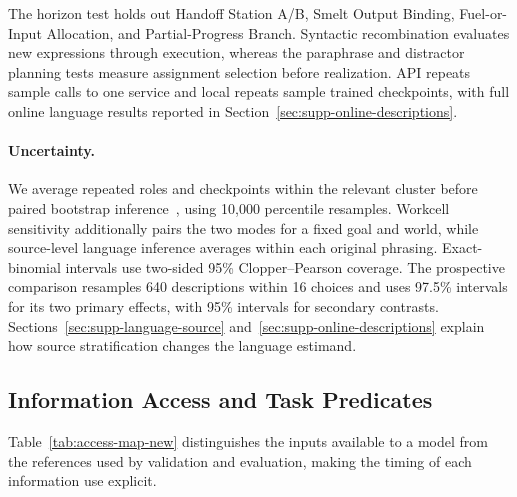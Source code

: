 \documentclass[sigconf,nonacm,balance=false]{aamas}
\begin{document}
The horizon test holds out Handoff Station A/B, Smelt Output Binding, Fuel-or-Input Allocation, and Partial-Progress Branch. Syntactic recombination evaluates new expressions through execution, whereas the paraphrase and distractor planning tests measure assignment selection before realization. API repeats sample calls to one service and local repeats sample trained checkpoints, with full online language results reported in Section~\ref{sec:supp-online-descriptions}.

\paragraph{Uncertainty.}
We average repeated roles and checkpoints within the relevant cluster before paired bootstrap inference~\cite{efron1994bootstrap}, using 10,000 percentile resamples. Workcell sensitivity additionally pairs the two modes for a fixed goal and world, while source-level language inference averages within each original phrasing. Exact-binomial intervals use two-sided 95\% Clopper--Pearson coverage. The prospective comparison resamples 640 descriptions within 16 choices and uses 97.5\% intervals for its two primary effects, with 95\% intervals for secondary contrasts. Sections~\ref{sec:supp-language-source} and~\ref{sec:supp-online-descriptions} explain how source stratification changes the language estimand.

\subsection{Information Access and Task Predicates}
\label{sec:supp-access-new}

Table~\ref{tab:access-map-new} distinguishes the inputs available to a model from the references used by validation and evaluation, making the timing of each information use explicit.
\end{document}
